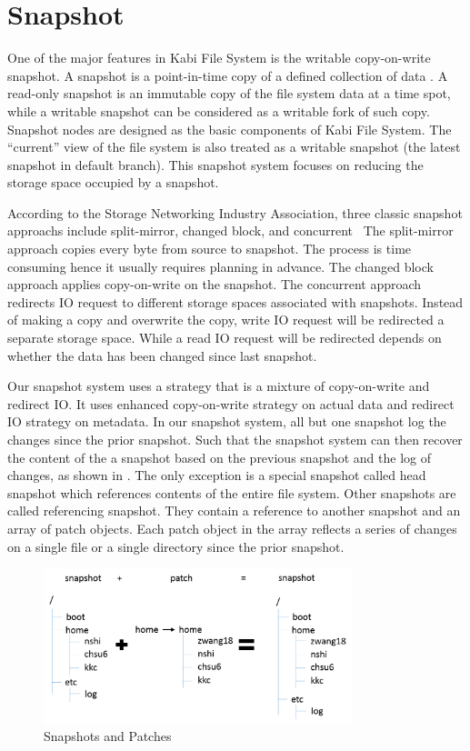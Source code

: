 \chapter{Snapshot}
\label{chap:snapshot}

    One of the major features in Kabi File System is the writable copy-on-write snapshot. A snapshot is a point-in-time copy of a defined collection of data \cite{snapshot_def}. A read-only snapshot is an immutable copy of the file system data at a time spot, while a writable snapshot can be considered as a writable fork of such copy. Snapshot nodes are designed as the basic components of Kabi File System. The ``current'' view of the file system is also treated as a writable snapshot (the latest snapshot in default branch). This snapshot system focuses on reducing the storage space occupied by a snapshot.

    According to the Storage Networking Industry Association, three classic snapshot approachs include split-mirror, changed block, and concurrent~\cite{snapshot_types} The split-mirror approach copies every byte from source to snapshot. The process is time consuming hence it usually requires planning in advance. The changed block approach applies copy-on-write on the snapshot. The concurrent approach redirects IO request to different storage spaces associated with snapshots. Instead of making a copy and overwrite the copy, write IO request will be redirected a separate storage space. While a read IO request will be redirected depends on whether the data has been changed since last snapshot.

    Our snapshot system uses a strategy that is a mixture of copy-on-write and redirect IO. It uses enhanced copy-on-write strategy on actual data and redirect IO strategy on metadata. In our snapshot system, all but one snapshot log the changes since the prior snapshot. Such that the snapshot system can then recover the content of the a snapshot based on the previous snapshot and the log of changes, as shown in . The only exception is a special snapshot called head snapshot which references contents of the entire file system. Other snapshots are called referencing snapshot. They contain a reference to another snapshot and an array of patch objects. Each patch object in the array reflects a series of changes on a single file or a single directory since the prior snapshot.

\begin{figure}[t]
\centering
\includegraphics[width=0.8\textwidth]{Chapter-4/figs/fig23.png}
\caption{Snapshots and Patches}
\label{fig:snapshot_patch}
\end{figure}

